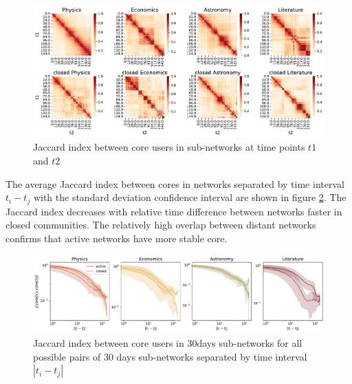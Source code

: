 \begin{figure}[h!]
	\centering
	\includegraphics[width=\linewidth]{figures/stackexchange/jaccard_heatmap.pdf}
	\caption{Jaccard index between core users in  sub-networks at time points $t1$ and $t2$}
	\label{fig:jaccard_hm}
\end{figure}  

The average Jaccard index between cores in networks separated by time interval $t_i-t_j$ with the standard deviation confidence interval are shown in figure \ref{fig:jaccard_mean}. The Jaccard index decreases with relative time difference between networks faster in closed communities. The relatively high overlap between distant networks confirms that active networks have more stable core. 

\begin{figure}[h!]
	\centering
	\includegraphics[width=\linewidth]{figures/stackexchange/jaccard.pdf}
	\caption{Jaccard index between core users in 30days sub-networks for all possible pairs of 30 days sub-networks separated by time interval $|t_i - t_j|$}
	\label{fig:jaccard_mean}
\end{figure}

